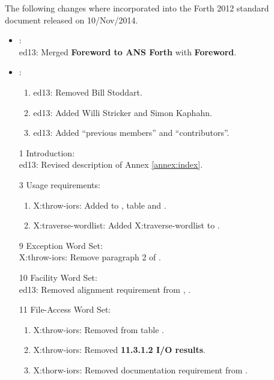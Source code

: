 	The following changes where incorporated into the Forth 2012 standard
	document released on 10/Nov/2014.

	\begin{itemize}
	\item {}:							%
		~\\ \textsf{ed13}: Merged \textbf{Foreword to ANS Forth} with \textbf{Foreword}.

	\item {}:							%
		\begin{enumerate}
		\item \textsf{ed13}: Removed Bill Stoddart.
		\item \textsf{ed13}: Added Willi Stricker and Simon Kaphahn.
		\item \textsf{ed13}: Added ``previous members'' and ``contributors''.
		\end{enumerate}

	\item[1] Introduction:							%
		~ \\
		\textsf{ed13}: Revised description of Annex \ref{annex:index}.

	\item[3] Usage requirements:					%
		\begin{enumerate}
		\item \textsf{X:throw-iors}:
			Added  to , table 
			and .
		\item \textsf{X:traverse-wordlist}:
			Added \textsf{X:traverse-wordlist} to .
		\end{enumerate}

	\item[9] Exception Word Set:					%
		~ \\
		\textsf{X:throw-iors}: Remove paragraph 2 of .

	\item[10] Facility Word Set:					%
		~ \\
		\textsf{ed13}: Removed alignment requirement from , .

	\item[11] File-Access Word Set:				%
		\begin{enumerate}
		\item \textsf{X:throw-iors}: Removed  from table .
		\item \textsf{X:throw-iors}: Removed \textbf{11.3.1.2 I/O results}.
		\item \textsf{X:thorw-iors}: Removed  documentation requirement from .
		\end{enumerate}


\end{itemize}

